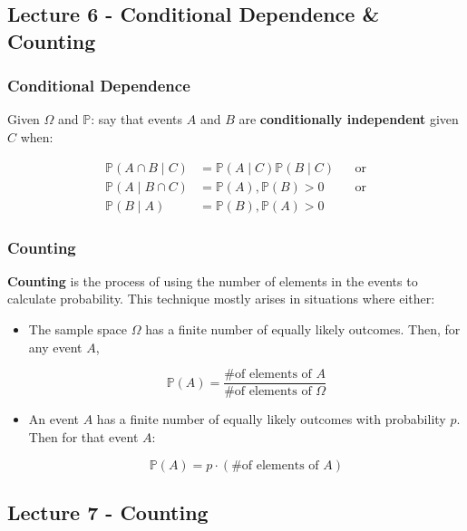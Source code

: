 \documentclass{article}
\begin{document}
\subsection{Lecture 6 - Conditional Dependence \& Counting}

\subsubsection{Conditional Dependence}

Given $\Omega$ and $\mathbb{P}$: say that events $A$ and $B$ are
\textbf{conditionally independent} given $C$ when:

\begin{equation}
  \tag{Conditional Independence Def}
  \boxed{
    \begin{aligned}
      \mathbb{P}(A \cap B \mid C)
      &= \mathbb{P}(A \mid C) \mathbb{P}(B \mid C)
      && \text{or} \\
      \mathbb{P}(A \mid B \cap C)
      &= \mathbb{P}(A), \mathbb{P}(B) > 0
      && \text{or} \\
      \mathbb{P}(B \mid A)
      &= \mathbb{P}(B), \mathbb{P}(A) > 0
    \end{aligned}
  }
\end{equation}

\subsubsection{Counting}

\textbf{Counting} is the process of using the number of elements in
the events to calculate probability. This technique mostly arises in
situations where either:

\begin{itemize}
\item The sample space $\Omega$ has a finite number of equally likely
  outcomes. Then, for any event $A$,

  \[
    \mathbb{P}(A) = \frac{\text{\# of elements of } A}
    {\text{\# of elements of } \Omega}
  \]

\item An event $A$ has a finite number of equally likely outcomes with
  probability $p$. Then for that event $A$:

  \[
    \mathbb{P}(A) = p \cdot (\text{\# of elements of }A)
  \]
\end{itemize}


\subsection{Lecture 7 - Counting}
\end{document}
